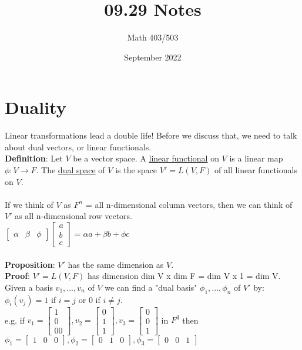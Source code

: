 \documentclass{article}
\title{09.29 Notes}
\author{Math 403/503}
\date{September 2022}
\begin{document}
\maketitle

\section{Duality}
Linear transformations lead a double life! Before we discuss that, we need to talk about dual vectors, or linear functionals. \\
\textbf{Definition}: Let $V$ be a vector space. A \underline{linear functional} on $V$ is a linear map $\phi : V \rightarrow F$. The \underline{dual space} of $V$ is the space $V' = L(V,F)$ of all linear functionals on $V$. \\\\
If we think of $V$ as $F^n$ = all n-dimensional column vectors, then we can think of $V'$ as all n-dimensional row vectors. \\
$\begin{bmatrix} 
\alpha & \beta & \phi
\end{bmatrix} \begin{bmatrix}
    a\\b\\c
\end{bmatrix} = \alpha a + \beta b + \phi c$\\\\
\textbf{Proposition}: $V'$ has the same dimension as $V$. \\
\textbf{Proof}: $V' = L(V,F)$ has dimension dim V x dim F = dim V x 1 = dim V. Given a basis $v_1, ..., v_n$ of $V$ we can find a "dual basis" $\phi_1, ..., \phi_n$ of $V'$ by: $\phi_i(v_j) = 1$ if $i = j$ or $0$ if $i \neq j$. \\
e.g. if $v_1 = \begin{bmatrix}
    1\\0\\00
\end{bmatrix}, v_2 = \begin{bmatrix}
    0\\1\\1
\end{bmatrix}, v_3 = \begin{bmatrix}
    0\\0\\1
\end{bmatrix}$ in $F^3$ then $\phi_1 = \begin{bmatrix}
    1 & 0 & 0
\end{bmatrix}, \phi_2 = \begin{bmatrix}
    0 & 1 & 0 
\end{bmatrix}, \phi_3 = \begin{bmatrix}
    0&0&1
\end{bmatrix}$\\
\end{document}
